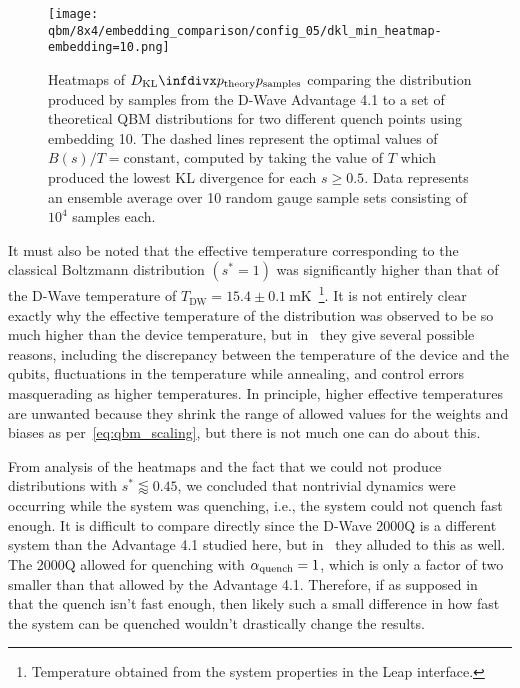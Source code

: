 \begin{figure}[!htb]
    \begin{center}
        \texttt{[image: qbm/8x4/embedding\_comparison/config\_05/dkl\_min\_heatmap-embedding=10.png]}
    \end{center}
    \caption{
        Heatmaps of \( \DKL{\ptheory}{\psamples} \) comparing the distribution produced by samples from the D-Wave Advantage 4.1 to a set of theoretical QBM distributions for two different quench points using embedding 10.
        The dashed lines represent the optimal values of \( B(s) / T = \text{constant} \), computed by taking the value of \( T \) which produced the lowest KL divergence for each \( s \ge 0.5 \).
        Data represents an ensemble average over 10 random gauge sample sets consisting of \( 10^4 \) samples each.
    }
    \label{fig:dkl_min_heatmap}
\end{figure}

It must also be noted that the effective temperature corresponding to the classical Boltzmann distribution \( (s^* = 1) \) was significantly higher than that of the D-Wave temperature of \( T_\text{DW} = 15.4 \pm 0.1 \ \si{\milli\kelvin} \)~\cite{dwave_leap}\footnote{Temperature obtained from the system properties in the Leap interface.}.
It is not entirely clear exactly why the effective temperature of the distribution was observed to be so much higher than the device temperature, but in~\cite{marshall_2019} they give several possible reasons, including the discrepancy between the temperature of the device and the qubits, fluctuations in the temperature while annealing, and control errors masquerading as higher temperatures.
In principle, higher effective temperatures are unwanted because they shrink the range of allowed values for the weights and biases as per~\cref{eq:qbm_scaling}, but there is not much one can do about this.

From analysis of the heatmaps and the fact that we could not produce distributions with \( s^* \lessapprox 0.45 \), we concluded that nontrivial dynamics were occurring while the system was quenching, i.e., the system could not quench fast enough.
It is difficult to compare directly since the D-Wave 2000Q is a different system than the Advantage 4.1 studied here, but in~\cite{marshall_2019} they alluded to this as well.
The 2000Q allowed for quenching with \( \alpha_{\text{quench}} = 1 \), which is only a factor of two smaller than that allowed by the Advantage 4.1.
Therefore, if as supposed in~\cite{marshall_2019} that the quench isn't fast enough, then likely such a small difference in how fast the system can be quenched wouldn't drastically change the results.

